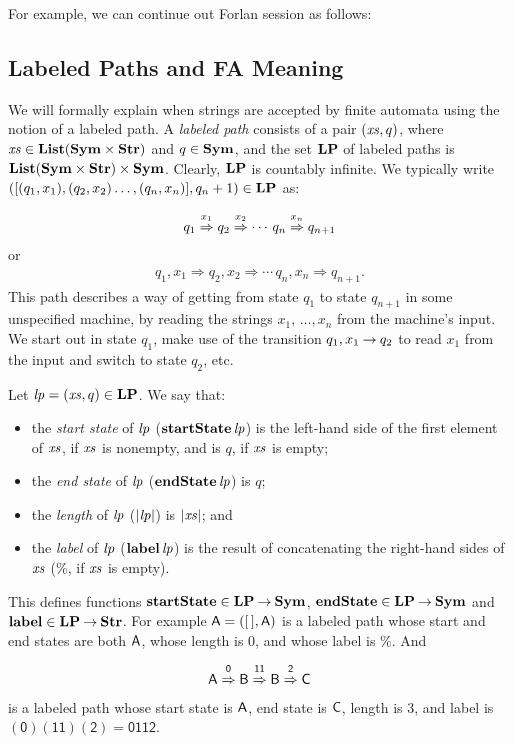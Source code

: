 For example, we can continue out Forlan session as follows:


\subsection{Labeled Paths and FA Meaning}

We will formally explain when strings are accepted by finite automata
using the notion of a labeled path.  A \emph{labeled path} consists of
a pair $({\it xs},q)$, where ${\it xs}\in\mathbf{List}(\mathbf{Sym}\times\mathbf{Str})$ and $q\in\mathbf{Sym}$,
and the set $\mathbf{LP}$ of labeled paths is
$\mathbf{List}(\mathbf{Sym}\times\mathbf{Str})\times\mathbf{Sym}$.  Clearly, $\mathbf{LP}$ is countably
infinite.  We typically write
$([(q_1,x_1),(q_2,x_2)\ldots,(q_n,x_n)],q_n+1)\in\mathbf{LP}$ as:
\begin{gather*}
q_1\stackrel{\strut x_1}{\Rightarrow}q_2\stackrel{\strut x_2}{\Rightarrow}\cdots\,q_n\stackrel{\strut x_n}{\Rightarrow}q_{n+1}
\end{gather*}
or
\begin{gather*}
q_1,x_1\Rightarrow q_2,x_2\Rightarrow\cdots\,q_n,x_n\Rightarrow q_{n+1} .
\end{gather*}
This path describes a way of getting from state $q_1$ to state $q_{n+1}$
in some unspecified machine, by reading the strings
$x_1,\,\ldots,x_n$ from the machine's input.  We start out in
state $q_1$, make use of the transition $q_1,x_1\mathbin{\to} q_2$ to read
$x_1$ from the input and switch to state $q_2$, etc.

Let ${\it lp}=({\it xs},q)\in\mathbf{LP}$.
We say that:
\begin{itemize}
\item the \emph{start state} of ${\it lp}$ ($\mathbf{startState}\,{\it lp}$) is
  the left-hand side of the first element of ${\it xs}$, if ${\it xs}$ is nonempty,
  and is $q$, if ${\it xs}$ is empty;

\item the \emph{end state} of ${\it lp}$ ($\mathbf{endState}\,{\it lp}$) is $q$;

\item the \emph{length} of ${\it lp}$ ($|{\it lp}|$) is $|{\it xs}|$; and

\item the \emph{label} of ${\it lp}$ ($\mathbf{label}\,{\it lp}$) is the result of
  concatenating the right-hand sides of ${\it xs}$ ($\%$, if ${\it xs}$ is
  empty).
\end{itemize}
This defines functions $\mathbf{startState}\in\mathbf{LP}\mathbin{\to}\mathbf{Sym}$,
$\mathbf{endState}\in\mathbf{LP}\mathbin{\to}\mathbf{Sym}$ and $\mathbf{label}\in\mathbf{LP}\mathbin{\to}\mathbf{Str}$.
For example $\mathsf{A} = ([\,],\mathsf{A})$
is a labeled path whose start and end states are both $\mathsf{A}$, whose
length is $0$, and whose label is $\%$.  And
\begin{gather*}
\mathsf{A}\stackrel{\strut\mathsf{0}}{\Rightarrow}\mathsf{B}\stackrel{\strut\mathsf{11}}{\Rightarrow}\mathsf{B}\stackrel{\strut\mathsf{2}}{\Rightarrow}\mathsf{C}
\end{gather*}
is a labeled path whose start state is $\mathsf{A}$, end state is $\mathsf{C}$,
length is $3$, and label is $\mathsf{(0)(11)(2)}=\mathsf{0112}$.

